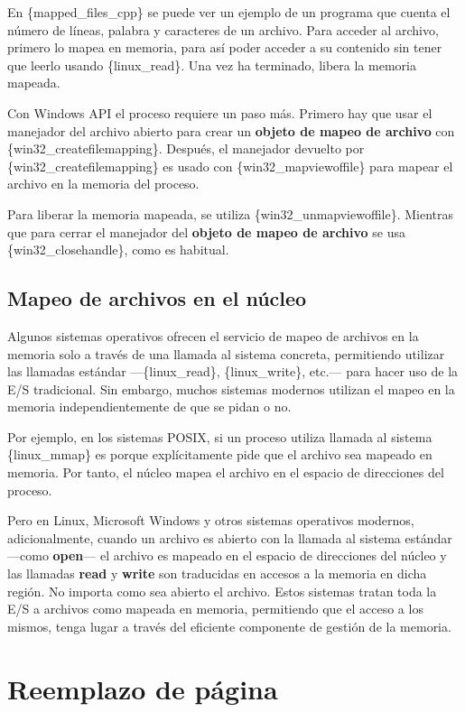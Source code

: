 En \{mapped\_files\_cpp\} se puede ver un ejemplo de un programa que
cuenta el número de líneas, palabra y caracteres de un archivo. Para
acceder al archivo, primero lo mapea en memoria, para así poder acceder
a su contenido sin tener que leerlo usando \{linux\_read\}. Una vez ha
terminado, libera la memoria mapeada.

Con Windows API el proceso requiere un paso más. Primero hay que usar el
manejador del archivo abierto para crear un \textbf{objeto de mapeo de
archivo} con \{win32\_createfilemapping\}. Después, el manejador
devuelto por \{win32\_createfilemapping\} es usado con
\{win32\_mapviewoffile\} para mapear el archivo en la memoria del
proceso.

Para liberar la memoria mapeada, se utiliza \{win32\_unmapviewoffile\}.
Mientras que para cerrar el manejador del \textbf{objeto de mapeo de
archivo} se usa \{win32\_closehandle\}, como es habitual.

\subsection{Mapeo de archivos en el
núcleo}\label{_mapeo_de_archivos_en_el_nuxfacleo}

Algunos sistemas operativos ofrecen el servicio de mapeo de archivos en
la memoria solo a través de una llamada al sistema concreta, permitiendo
utilizar las llamadas estándar ---\{linux\_read\}, \{linux\_write\},
etc.--- para hacer uso de la E/S tradicional. Sin embargo, muchos
sistemas modernos utilizan el mapeo en la memoria independientemente de
que se pidan o no.

Por ejemplo, en los sistemas POSIX, si un proceso utiliza llamada al
sistema \{linux\_mmap\} es porque explícitamente pide que el archivo sea
mapeado en memoria. Por tanto, el núcleo mapea el archivo en el espacio
de direcciones del proceso.

Pero en Linux, Microsoft Windows y otros sistemas operativos modernos,
adicionalmente, cuando un archivo es abierto con la llamada al sistema
estándar ---como \textbf{open}--- el archivo es mapeado en el espacio de
direcciones del núcleo y las llamadas \textbf{read} y \textbf{write} son
traducidas en accesos a la memoria en dicha región. No importa como sea
abierto el archivo. Estos sistemas tratan toda la E/S a archivos como
mapeada en memoria, permitiendo que el acceso a los mismos, tenga lugar
a través del eficiente componente de gestión de la memoria.

\section{Reemplazo de página}\label{_reemplazo_de_puxe1gina}

